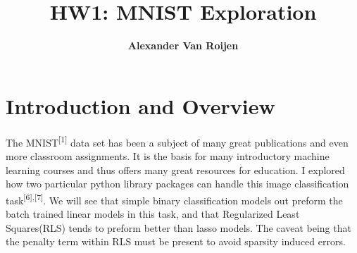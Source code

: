 \documentclass[12pt]{article}
\begin{document}
	
	\title{%
		HW1: MNIST Exploration}
	\author{\bf Alexander Van Roijen}
	
	\maketitle
	\section{Introduction and Overview}
	The MNIST\textsuperscript{[1]} data set has been a subject of many great publications and even more classroom assignments. It is the basis for many introductory machine learning courses and thus offers many great resources for education. I explored how two particular python library packages can handle this image classification task\textsuperscript{[6],[7]}. We will see that simple binary classification models out preform the batch trained linear models in this task, and that Regularized Least Squares(RLS) tends to preform better than lasso models. The caveat being that the penalty term within RLS must be present to avoid sparsity induced errors.
	
\end{document}
